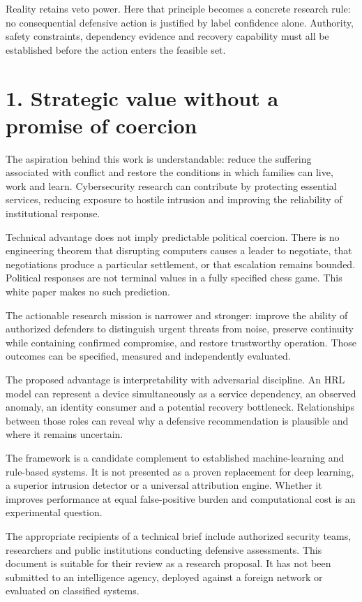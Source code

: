 \documentclass[11pt]{article}
\begin{document}
Reality retains veto power. Here that principle becomes a concrete research rule: no consequential defensive action is justified by label confidence alone. Authority, safety constraints, dependency evidence and recovery capability must all be established before the action enters the feasible set.

\clearpage
\section*{1. Strategic value without a promise of coercion}
The aspiration behind this work is understandable: reduce the suffering associated with conflict and restore the conditions in which families can live, work and learn. Cybersecurity research can contribute by protecting essential services, reducing exposure to hostile intrusion and improving the reliability of institutional response.

Technical advantage does not imply predictable political coercion. There is no engineering theorem that disrupting computers causes a leader to negotiate, that negotiations produce a particular settlement, or that escalation remains bounded. Political responses are not terminal values in a fully specified chess game. This white paper makes no such prediction.

The actionable research mission is narrower and stronger: improve the ability of authorized defenders to distinguish urgent threats from noise, preserve continuity while containing confirmed compromise, and restore trustworthy operation. Those outcomes can be specified, measured and independently evaluated.

The proposed advantage is interpretability with adversarial discipline. An HRL model can represent a device simultaneously as a service dependency, an observed anomaly, an identity consumer and a potential recovery bottleneck. Relationships between those roles can reveal why a defensive recommendation is plausible and where it remains uncertain.

The framework is a candidate complement to established machine-learning and rule-based systems. It is not presented as a proven replacement for deep learning, a superior intrusion detector or a universal attribution engine. Whether it improves performance at equal false-positive burden and computational cost is an experimental question.

The appropriate recipients of a technical brief include authorized security teams, researchers and public institutions conducting defensive assessments. This document is suitable for their review as a research proposal. It has not been submitted to an intelligence agency, deployed against a foreign network or evaluated on classified systems.
\end{document}
